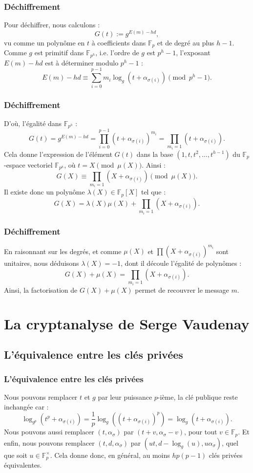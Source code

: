 \documentclass{beamer}
\theoremstyle{definition}
\theoremstyle{remark}
\def\gf #1{\mathbb{F}_{#1}}
\begin{document}
\begin{frame}
  \frametitle{Déchiffrement}
  Pour déchiffrer, nous calculons :
$$G(t) := g^{E(m) - hd},$$
vu comme un polynôme en $t$ à coefficients dans $\gf{p}$ et de degré au plus $h-1$. Comme $g$ est primitif dans $\gf{p^h}$, i.e. l'ordre de $g$ est $p^h-1$, l'exposant $E(m) - hd$ est à déterminer modulo $p^h-1$ :
$$E(m) - hd \equiv  \sum_{i=0}^{p-1} m_i\log_g\left(t + \alpha_{\sigma(i)}\right) \pmod{p^h-1}.$$
\end{frame}
\begin{frame}
  \frametitle{Déchiffrement}
D'où, l'égalité dans $\gf{p^h}$ :
$$G(t) = g^{E(m) - hd} = \prod_{i=0}^{p-1} \left(t+\alpha_{\sigma(i)}\right)^{m_i} = \prod_{m_i = 1} \left(t+\alpha_{\sigma(i)}\right).$$
Cela donne l'expression de l'élément $G(t)$ dans la base $(1,t,t^2, \dots, t^{h-1})$ du $\gf{p}$-espace vectoriel $\gf{p^h}$, où $t = X \pmod{\mu(X)}$. Ainsi :
$$G(X) \equiv \prod_{m_i = 1} \left(X+\alpha_{\sigma(i)}\right) \pmod{\mu(X)}.$$
Il existe donc un polynôme $\lambda(X) \in \gf{p}[X]$ tel que : $$G(X) = \lambda(X) \mu(X) + \prod_{m_i = 1} \left(X+\alpha_{\sigma(i)}\right).$$
\end{frame}
\begin{frame}
  \frametitle{Déchiffrement}
En raisonnant sur les degrés, et comme $\mu(X)$ et $\prod \left(X+\alpha_{\sigma(i)}\right)^{m_i}$ sont unitaires, nous déduisons  $\lambda(X) = -1$, dont il découle l'égalité de polynômes :
$$G(X) + \mu(X) = \prod_{m_i = 1} \left(X+\alpha_{\sigma(i)}\right).$$
Ainsi, la factorisation de $G(X)+\mu(X)$ permet de recouvrer le message $m$.
\end{frame}

\section{La cryptanalyse de Serge Vaudenay}
\subsection{L'équivalence entre les clés privées}
\begin{frame}
	\frametitle{L'équivalence entre les clés privées}
Nous pouvons remplacer $t$ et $g$ par leur puissance $p$-ième, la clé publique reste inchangée car :
$$\log_{g^p}\left(t^p + \alpha_{\sigma(i)}\right) = \frac{1}{p}\log_{g}\left(\left(t + \alpha_{\sigma(i)}\right)^p\right) = \log_{g}\left(t + \alpha_{\sigma(i)}\right).$$
Nous pouvons aussi remplacer $(t, \alpha_{\sigma})$ par $(t + v, \alpha_{\sigma} - v)$, pour tout $v \in \gf{p}$. Et enfin, nous pouvons remplacer $(t,d,\alpha_\sigma)$ par $(ut, d - \log_g(u), u\alpha_\sigma)$, quel que soit $u \in \gf{p}^\times$.
Cela donne donc, en général, au moins $hp(p-1)$ clés privées équivalentes.
\end{frame}
\end{document}
